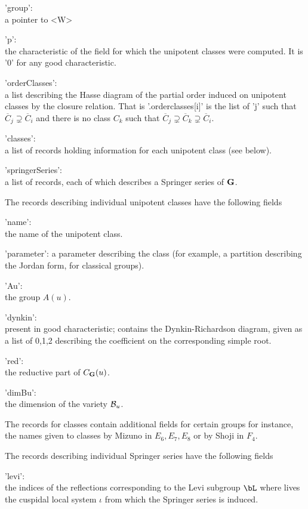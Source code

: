 'group':\\ a pointer to <W>

'p':\\ the characteristic of the field for which the unipotent classes were
computed. It is '0' for any good characteristic.

'orderClasses':\\  a list describing the Hasse diagram of the partial order
induced   on   unipotent   classes   by   the  closure  relation.  That  is
'.orderclasses[i]'  is the list of 'j' such that ${\overline C}_j\supsetneq
{\overline  C}_i$  and  there  is  no  class  $C_k$  such  that ${\overline
C}_j\supsetneq {\overline C}_k\supsetneq {\overline C}_i$.

'classes':\\  a  list  of  records  holding information for each unipotent
class (see below).

'springerSeries':\\  a list of records, each  of which describes a Springer
series  of ${\bf G}$.

The  records  describing  individual  unipotent  classes have the following
fields\:

'name':\\ the name of the unipotent class.

'parameter':  a parameter  describing the  class (for  example, a partition
describing the Jordan form, for classical groups).

'Au':\\ the group $A(u)$.

'dynkin':\\  present in good characteristic; contains the Dynkin-Richardson
diagram,  given  as  a  list  of  0,1,2  describing  the coefficient on the
corresponding simple root.

'red':\\  the reductive part of $C_{\bf G}(u)$.

'dimBu':\\  the dimension of the variety ${\mathcal B}_u$.

The  records for classes contain additional fields for certain groups\: for
instance,  the names given  to classes by  Mizuno in $E_6,  E_7, E_8$ or by
Shoji in $F_4$.

The  records  describing  individual  Springer  series  have  the following
fields\:

'levi':\\the  indices of the reflections corresponding to the Levi subgroup
$\bL$ where lives the cuspidal local system $\iota$ from which the Springer
series is induced.

